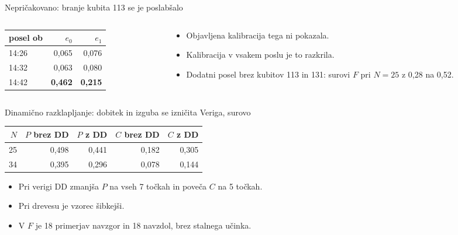 \documentclass[aspectratio=169,11pt]{beamer}
\begin{document}
\begin{frame}{Nepričakovano: branje kubita 113 se je poslabšalo}
\begin{columns}[T]
\begin{column}{0.46\textwidth}
\centering
\begin{tabular}{lrr}
\toprule
posel ob & $e_0$ & $e_1$ \\
\midrule
14:26 & 0,065 & 0,076 \\
14:32 & 0,063 & 0,080 \\
14:42 & \textbf{0,462} & \textbf{0,215} \\
\bottomrule
\end{tabular}
\end{column}
\begin{column}{0.5\textwidth}
\begin{itemize}
\item Objavljena kalibracija tega ni pokazala.
\item Kalibracija v vsakem poslu je to razkrila.
\item Dodatni posel brez kubitov 113 in 131: surovi $F$ pri $N=25$ z 0,28 na 0,52.
\end{itemize}
\end{column}
\end{columns}
\end{frame}

\begin{frame}{Dinamično razklapljanje: dobitek in izguba se izničita}
\centering
Veriga, surovo\par\medskip
\begin{tabular}{rrrrr}
\toprule
$N$ & $P$ brez DD & $P$ z DD & $C$ brez DD & $C$ z DD \\
\midrule
25 & 0,498 & 0,441 & 0,182 & 0,305 \\
34 & 0,395 & 0,296 & 0,078 & 0,144 \\
\bottomrule
\end{tabular}
\par\bigskip
\begin{itemize}
\item Pri verigi DD zmanjša $P$ na vseh 7 točkah in poveča $C$ na 5 točkah.
\item Pri drevesu je vzorec šibkejši.
\item V $F$ je 18 primerjav navzgor in 18 navzdol, brez stalnega učinka.
\end{itemize}
\end{frame}
\end{document}
